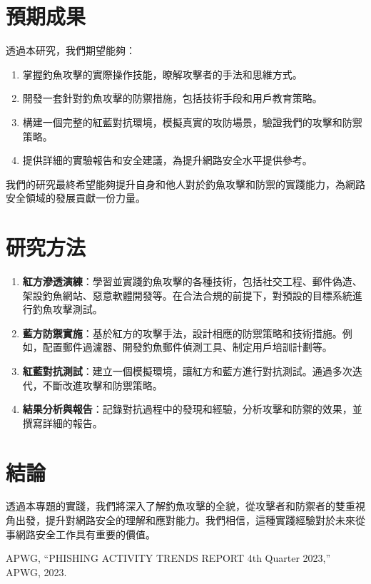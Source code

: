 \documentclass[a4paper,12pt]{article}
\begin{document}
\section{預期成果}
透過本研究，我們期望能夠：

\begin{enumerate}
  \item 掌握釣魚攻擊的實際操作技能，瞭解攻擊者的手法和思維方式。
  \item 開發一套針對釣魚攻擊的防禦措施，包括技術手段和用戶教育策略。
  \item 構建一個完整的紅藍對抗環境，模擬真實的攻防場景，驗證我們的攻擊和防禦策略。
  \item 提供詳細的實驗報告和安全建議，為提升網路安全水平提供參考。
\end{enumerate}

我們的研究最終希望能夠提升自身和他人對於釣魚攻擊和防禦的實踐能力，為網路安全領域的發展貢獻一份力量。

\section{研究方法}
\begin{enumerate}
  \item \textbf{紅方滲透演練}：學習並實踐釣魚攻擊的各種技術，包括社交工程、郵件偽造、架設釣魚網站、惡意軟體開發等。在合法合規的前提下，對預設的目標系統進行釣魚攻擊測試。
  \item \textbf{藍方防禦實施}：基於紅方的攻擊手法，設計相應的防禦策略和技術措施。例如，配置郵件過濾器、開發釣魚郵件偵測工具、制定用戶培訓計劃等。
  \item \textbf{紅藍對抗測試}：建立一個模擬環境，讓紅方和藍方進行對抗測試。通過多次迭代，不斷改進攻擊和防禦策略。
  \item \textbf{結果分析與報告}：記錄對抗過程中的發現和經驗，分析攻擊和防禦的效果，並撰寫詳細的報告。
\end{enumerate}

\section{結論}
透過本專題的實踐，我們將深入了解釣魚攻擊的全貌，從攻擊者和防禦者的雙重視角出發，提升對網路安全的理解和應對能力。我們相信，這種實踐經驗對於未來從事網路安全工作具有重要的價值。

\begin{thebibliography}{9}
   APWG, ``PHISHING ACTIVITY TRENDS REPORT 4th Quarter 2023,'' APWG, 2023.
\end{thebibliography}
\end{document}
